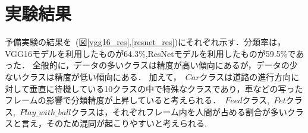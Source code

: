 \documentclass[twocolumn, a4paper]{UECIEresume}
\begin{document}
\section{実験結果}
予備実験の結果を~(図\ref{vgg16_res},\ref{resnet_res})にそれぞれ示す．分類率は，VGG16モデルを利用したものが64.3\%,ResNetモデルを利用したものが59.5\%であった．
全般的に，データの多いクラスは精度が高い傾向にあるが，データの少ないクラスは精度が低い傾向にある．
加えて，~\(Car\)クラスは道路の進行方向に対して垂直に待機している10クラスの中で特殊なクラスであり，車などの写ったフレームの影響で分類精度が上昇していると考えられる．~\(Feed\)クラス,~\(Pet\)クラス,~\(Play\_with\_ball\)クラスは，それぞれフレーム内を人間が占める割合が多いクラスと言え，そのため混同が起こりやすいと考えられる.

\end{document}
